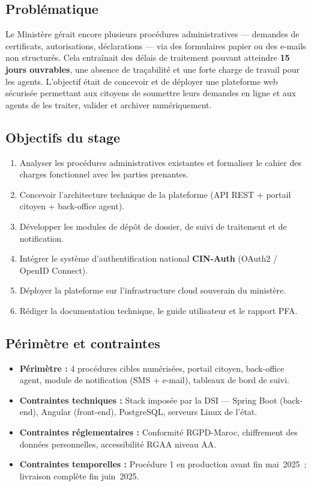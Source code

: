\documentclass[a4paper,11pt]{article}
\begin{document}
\subsection{Probl\'{e}matique}

Le Minist\`{e}re g\'{e}rait encore plusieurs proc\'{e}dures administratives ---
demandes de certificats, autorisations, d\'{e}clarations --- via des formulaires
papier ou des e-mails non structur\'{e}s. Cela entra\^{i}nait des d\'{e}lais de
traitement pouvant atteindre \textbf{15 jours ouvrables}, une absence de
tra\c{c}abilit\'{e} et une forte charge de travail pour les agents.
L'objectif \'{e}tait de concevoir et de d\'{e}ployer une plateforme web s\'{e}curis\'{e}e
permettant aux citoyens de soumettre leurs demandes en ligne et aux agents de les
traiter, valider et archiver num\'{e}riquement.

\subsection{Objectifs du stage}

\begin{enumerate}
  \item Analyser les proc\'{e}dures administratives existantes et formaliser le cahier
        des charges fonctionnel avec les parties prenantes.
  \item Concevoir l'architecture technique de la plateforme (API REST + portail citoyen + back-office agent).
  \item D\'{e}velopper les modules de d\'{e}p\^{o}t de dossier, de suivi de traitement et de notification.
  \item Int\'{e}grer le syst\`{e}me d'authentification national \textbf{CIN-Auth} (OAuth2 / OpenID Connect).
  \item D\'{e}ployer la plateforme sur l'infrastructure cloud souverain du minist\`{e}re.
  \item R\'{e}diger la documentation technique, le guide utilisateur et le rapport PFA.
\end{enumerate}

\subsection{P\'{e}rim\`{e}tre et contraintes}

\begin{itemize}
  \item \textbf{P\'{e}rim\`{e}tre :} 4 proc\'{e}dures cibles num\'{e}ris\'{e}es, portail
        citoyen, back-office agent, module de notification (SMS + e-mail), tableaux
        de bord de suivi.
  \item \textbf{Contraintes techniques :} Stack impos\'{e}e par la DSI --- Spring Boot
        (back-end), Angular (front-end), PostgreSQL, serveurs Linux de l'\'{e}tat.
  \item \textbf{Contraintes r\'{e}glementaires :} Conformit\'{e} RGPD-Maroc, chiffrement
        des donn\'{e}es personnelles, accessibilit\'{e} RGAA niveau AA.
  \item \textbf{Contraintes temporelles :} Proc\'{e}dure 1 en production avant fin mai~2025~;
        livraison compl\`{e}te fin juin~2025.
\end{itemize}
\end{document}
